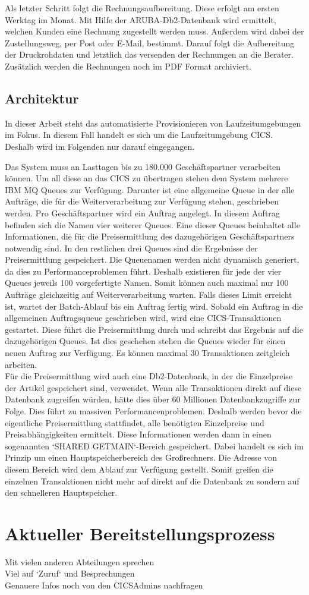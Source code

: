 Als letzter Schritt folgt die Rechnungsaufbereitung.
Diese erfolgt am ersten Werktag im Monat.
Mit Hilfe der ARUBA-Db2-Datenbank wird ermittelt, welchen Kunden eine Rechnung zugestellt werden muss.
Außerdem wird dabei der Zustellungsweg, per Post oder E-Mail, bestimmt.
Darauf folgt die Aufbereitung der Druckrohdaten und letztlich das versenden der Rechnungen an die Berater.
Zusätzlich werden die Rechnungen noch im PDF Format archiviert.

\subsection{Architektur}\label{rechArch}
In dieser Arbeit steht das automatisierte Provisionieren von Laufzeitumgebungen im Fokus.
In diesem Fall handelt es sich um die Laufzeitumgebung CICS.
Deshalb wird im Folgenden nur darauf eingegangen.

Das System muss an Lasttagen bis zu 180.000 Geschäftspartner verarbeiten können.
Um all diese an das CICS zu übertragen stehen dem System mehrere IBM MQ Queues zur Verfügung.
Darunter ist eine allgemeine Queue in der alle Aufträge, die für die Weiterverarbeitung zur Verfügung stehen, geschrieben werden.
Pro Geschäftspartner wird ein Auftrag angelegt.
In diesem Auftrag befinden sich die Namen vier weiterer Queues.
Eine dieser Queues beinhaltet alle Informationen, die für die Preisermittlung des dazugehörigen Geschäftspartners notwendig sind.
In den restlichen drei Queues sind die Ergebnisse der Preisermittlung gespeichert.
Die Queuenamen werden nicht dynamisch generiert, da dies zu Performanceproblemen führt.
Deshalb existieren für jede der vier Queues jeweils 100 vorgefertigte Namen.
Somit können auch maximal nur 100 Aufträge gleichzeitig auf Weiterverarbeitung warten.
Falls dieses Limit erreicht ist, wartet der Batch-Ablauf bis ein Auftrag fertig wird.
Sobald ein Auftrag in die allgemeinen Auftragsqueue geschrieben wird, wird eine CICS-Transaktionen gestartet.
Diese führt die Preisermittlung durch und schreibt das Ergebnis auf die dazugehörigen Queues.
Ist dies geschehen stehen die Queues wieder für einen neuen Auftrag zur Verfügung.
Es können maximal 30 Transaktionen zeitgleich arbeiten.\\
Für die Preisermittlung wird auch eine Db2-Datenbank, in der die Einzelpreise der Artikel gespeichert sind, verwendet.
Wenn alle Transaktionen direkt auf diese Datenbank zugreifen würden, hätte dies über 60 Millionen Datenbankzugriffe zur Folge.
Dies führt zu massiven Performancenproblemen.
Deshalb werden bevor die eigentliche Preisermittlung stattfindet, alle benötigten Einzelpreise und Preisabhängigkeiten ermittelt.
Diese Informationen werden dann in einen sogenannten `SHARED GETMAIN`-Bereich gespeichert.
Dabei handelt es sich im Prinzip um einen Hauptspeicherbereich des Großrechners.
Die Adresse von diesem Bereich wird dem Ablauf zur Verfügung gestellt.
Somit greifen die einzelnen Transaktionen nicht mehr auf direkt auf die Datenbank zu sondern auf den schnelleren Hauptspeicher.

\section{Aktueller Bereitstellungsprozess}
Mit vielen anderen Abteilungen sprechen\\
Viel auf `Zuruf` und Besprechungen\\
Genauere Infos noch von den CICSAdmins nachfragen\\

 